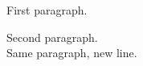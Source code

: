 \documentclass{article}
\begin{document}
First paragraph.

Second paragraph.\\
Same paragraph, new line.
\end{document}
